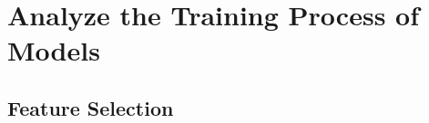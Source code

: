 \newpage

\chapter{Analyze the Training Process of Models}




















\section{Feature Selection}













% 
